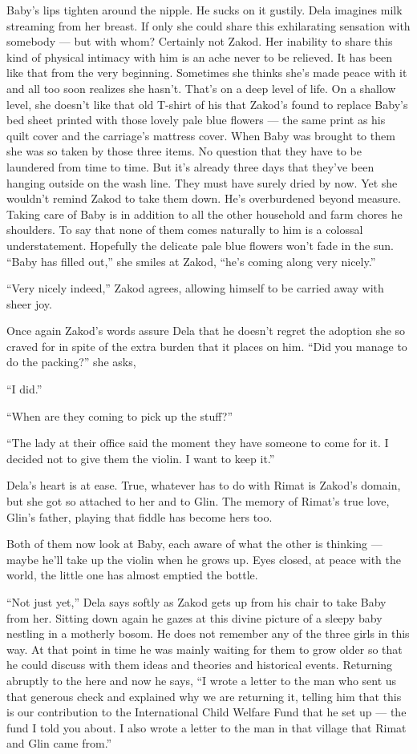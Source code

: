 \documentclass[twoside,11pt,openany]{book}
\begin{document}
Baby's lips tighten around the nipple. He sucks on it gustily. Dela imagines milk streaming from her breast.  If only
she could share this exhilarating sensation with somebody --- but with whom? Certainly not Zakod. Her inability to share
this kind of physical intimacy with him is an ache never to be relieved. It has been like that from the very
beginning. Sometimes she thinks she's made peace with it and all too soon realizes she hasn't. That's on a deep level
of life. On a shallow level, she doesn't like that old T-shirt of his that Zakod's found to replace Baby's bed
sheet printed with those lovely pale blue flowers --- the same print as his quilt cover and the carriage's mattress
cover. When Baby was brought to them she was so taken by those three items. No question that they have to be laundered
from time to time. But it's already three days that they've been hanging outside on the wash line. They must have
surely dried by now. Yet she wouldn't remind Zakod to take them down. He's overburdened beyond measure. Taking care
of Baby is in addition to all the other household and farm chores he shoulders. To say that none of them comes naturally to
him is a colossal understatement. Hopefully the delicate pale blue flowers won't fade in the sun. ``Baby
has filled out,'' she smiles at Zakod, ``he's coming along very nicely.''

``Very nicely indeed,'' Zakod agrees, allowing himself to be carried away with sheer joy.

Once again Zakod's words assure Dela that he doesn't regret the adoption she so craved for in spite of the extra burden
that it places on him. ``Did you manage to do the packing?'' she asks,

``I did.''

``When are they coming to pick up the stuff?''

``The lady at their office said the moment they have someone to come for it. I decided not to give them the
violin. I want to keep it.''

Dela's heart is at ease. True, whatever has to do with Rimat is Zakod's domain, but she got so attached to her and to
Glin. The memory of Rimat's true love, Glin's father, playing that fiddle has become hers too.

Both of them now look at Baby, each aware of what the other is thinking --- maybe he'll take up the violin when he grows
up. Eyes closed, at peace with the world, the little one has almost emptied the bottle.

``Not just yet,'' Dela says softly as Zakod gets up from his chair to take Baby from her.
Sitting down again he gazes at this divine picture of a sleepy baby nestling in a motherly bosom. He does not remember
any of the three girls in this way. At that point in time he was mainly waiting for them to grow older so that he
could discuss with them ideas and theories and historical events. Returning abruptly to the here and now he says,
``I wrote a letter to the man who sent us that generous check and explained why we are returning it,
telling him that this is our contribution to the International Child Welfare Fund that he set up --- the fund I told you
about.  I also wrote a letter to the man in that village that Rimat and Glin came from.''
\end{document}
